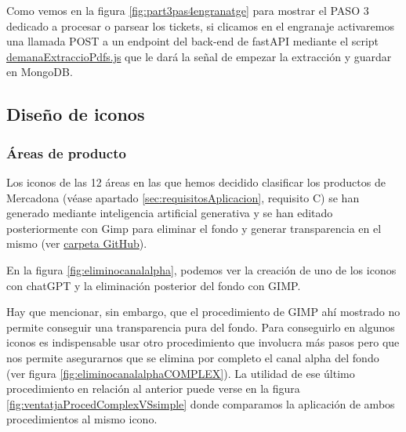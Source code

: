 \documentclass[a4paper,12pt]{report}
\begin{document}
	Como vemos en la figura \ref{fig:part3pas4engranatge} para mostrar el PASO 3 dedicado a procesar o parsear los tickets, si clicamos en el engranaje activaremos una llamada POST a un endpoint del back-end de fastAPI mediante el script \href{https://github.com/blackcub3s/mercApp/blob/main/APP%20WEB/__frontend__produccio__/app/js/pas4/demanaExtraccioPdfs.js}{demanaExtraccioPdfs.js} que le dará la señal de empezar la extracción y guardar en MongoDB.
	
	
	
	\subsection{Diseño de iconos}
	
	\subsubsection{Áreas de producto}
	
	Los iconos de las 12 áreas en las que hemos decidido clasificar los productos de Mercadona (véase apartado \ref{sec:requisitosAplicacion}, requisito C) se han generado mediante inteligencia artificial generativa y se han editado posteriormente con Gimp para eliminar el fondo y generar transparencia en el mismo (ver \href{https://github.com/blackcub3s/mercApp/tree/main/creacioIconos/categoriesProductes}{carpeta GitHub}).
	
	
	En la figura \ref{fig:eliminocanalalpha}, podemos ver la creación de uno de los iconos con chatGPT y la eliminación posterior del fondo con GIMP. 
	
	Hay que mencionar, sin embargo, que el procedimiento de GIMP ahí mostrado no permite conseguir una transparencia pura del fondo. Para conseguirlo en algunos iconos es indispensable usar otro procedimiento que involucra más pasos pero que nos permite asegurarnos que se elimina por completo el canal alpha del fondo (ver figura \ref{fig:eliminocanalalphaCOMPLEX}). La utilidad de ese último procedimiento en relación al anterior puede verse en la figura \ref{fig:ventatjaProcedComplexVSsimple} donde comparamos la aplicación de ambos procedimientos al mismo icono.


	
	
	
	
\end{document}
